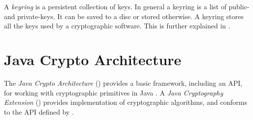 A \textit{keyring} is a persistent collection of keys. 
In general a keyring is a list of public- and private-keys. It can be saved to a disc or stored otherwise. 
A keyring stores all the keys used by a cryptographic software.
This is further explained in \cite[section 3.6]{RFC4880}.





\section{Java Crypto Architecture} \label{section:pre:jca}

The \textit{Java Crypto Architecture} () provides a basic framework, including an API, for working with cryptographic primitives in Java \cite{JCA}.
A \textit{Java Cryptography Extension} () provides implementation of cryptographic algorithms, and conforms to the API defined by .

